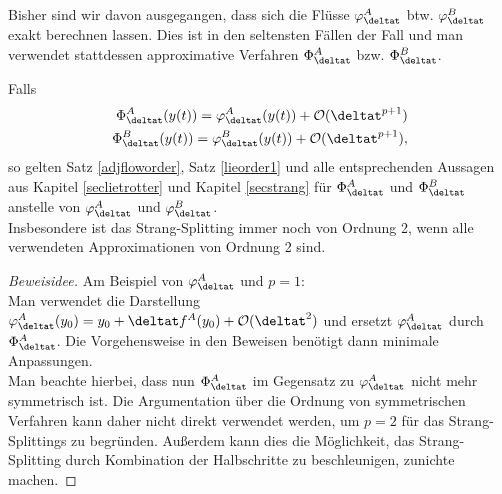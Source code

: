 Bisher sind wir davon ausgegangen, dass sich die Flüsse $\varphi_{\deltat}^A$ btw. $\varphi_{\deltat}^B$ exakt berechnen lassen. Dies ist in den seltensten Fällen der Fall und man verwendet stattdessen approximative Verfahren $\Phi_{\deltat}^A$ bzw. $\Phi_{\deltat}^B$. 
\begin{maththeorem}
Falls
\begin{align*}
\Phi_{\deltat}^A(y(t))=\varphi_{\deltat}^A(y(t))+\mathcal{O}(\deltat^{p+1})\\
\Phi_{\deltat}^B(y(t))=\varphi_{\deltat}^B(y(t))+\mathcal{O}(\deltat^{p+1}),
\end{align*}
so gelten Satz \ref{adjfloworder}, Satz \ref{lieorder1} und alle entsprechenden Aussagen aus Kapitel \ref{seclietrotter} und Kapitel \ref{secstrang} für $\Phi_{\deltat}^A$ und $\Phi_{\deltat}^B$ anstelle von $\varphi_{\deltat}^A$ und $\varphi_{\deltat}^B$.\\
Insbesondere ist das Strang-Splitting immer noch von Ordnung 2, wenn alle verwendeten Approximationen von Ordnung 2 sind.
\end{maththeorem}
\begin{proof}[Beweisidee]
Am Beispiel von $\varphi_{\deltat}^A$ und $p=1$:\\
Man verwendet die Darstellung $\varphi_{\deltat}^A(y_0)=y_0+\deltat f^A(y_0)+\mathcal{O}(\deltat^2)$ und ersetzt $\varphi_{\deltat}^A$ durch $\Phi_{\deltat}^A$. Die Vorgehensweise in den Beweisen benötigt dann minimale Anpassungen.\\
Man beachte hierbei, dass nun $\Phi_{\deltat}^A$ im Gegensatz zu $\varphi_{\deltat}^A$ nicht mehr symmetrisch ist. Die Argumentation über die Ordnung von symmetrischen Verfahren kann daher nicht direkt verwendet werden, um $p=2$ für das Strang-Splittings zu begründen. Außerdem kann dies die Möglichkeit, das Strang-Splitting durch Kombination der Halbschritte zu beschleunigen, zunichte machen.
\end{proof}

